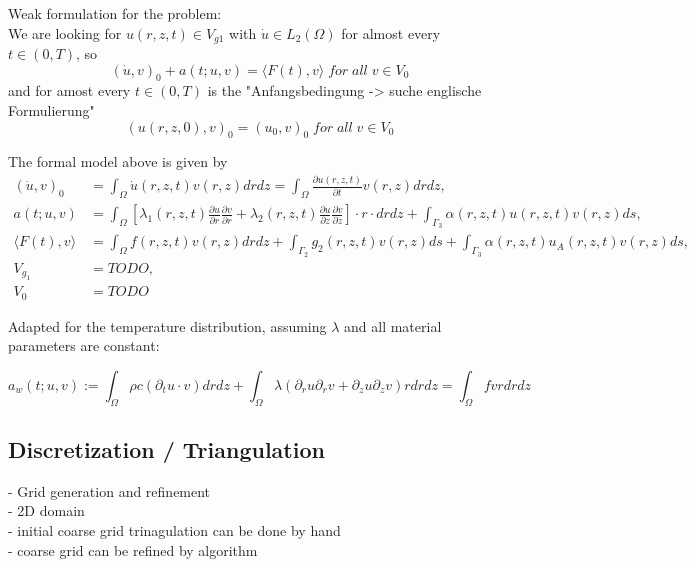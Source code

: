 \documentclass[parskip=half, titlepage=yes, 12pt, BCOR=12mm, DIV=calc]{scrartcl}
\begin{document}
Weak formulation for the problem: \\

We are looking for $u(r,z,t) \in V_{g1}$ with $\Dot{u} \in L_2(\Omega)$ for almost every $t \in (0,T)$, so \\ \begin{equation}
(\Dot{u},v)_0 + a(t;u,v) = \langle F(t),v \rangle \; for \; all \; v \in V_0    
\end{equation}
and for amost every $t \in (0, T)$ is the "Anfangsbedingung -> suche englische Formulierung"
\begin{equation}
    (u(r,z,0),v)_0 = (u_0,v)_0 \; for \; all \; v \in V_0
\end{equation}

The formal model above is given by 
\begin{align*}
    (\Dot{u},v)_0 &= \int_{\Omega} \Dot{u}(r,z,t)v(r,z) drdz = \int_{\Omega} \frac{\partial u(r,z,t)}{\partial t} v(r,z) drdz, \\
    a(t;u,v) &= \int_{\Omega} \left[ \lambda_1(r,z,t) \frac{\partial u}{\partial r} \frac{\partial v}{\partial r} + \lambda_2(r,z,t) \frac{\partial u}{\partial z} \frac{\partial v}{\partial z} \right] \cdot r \cdot drdz + \int_{\Gamma_3} \alpha(r,z,t)u(r,z,t)v(r,z) ds, \\
    \langle F(t),v \rangle &= \int_{\Omega} f(r,z,t)v(r,z) drdz + \int_{\Gamma_2} g_2(r,z,t)v(r,z) ds + \int_{\Gamma_3} \alpha(r,z,t)u_A(r,z,t)v(r,z) ds, \\
    V_{g_1} &= TODO, \\
    V_0 &= TODO
\end{align*}

Adapted for the temperature distribution, assuming $\lambda$ and all material parameters are constant: 

\begin{equation}
    a_w(t;u,v) := \int_{\Omega} \rho c (\partial_t u \cdot v) drdz + \int_{\Omega} \lambda (\partial_r u \partial_r v + \partial_z u \partial_z v) r drdz = \int_{\Omega} f v r dr dz
\end{equation}

\newpage


\subsection{Discretization / Triangulation}

- Grid generation and refinement \\
- 2D domain \\
- initial coarse grid trinagulation can be done by hand \\
- coarse grid can be refined by algorithm \\
\end{document}
